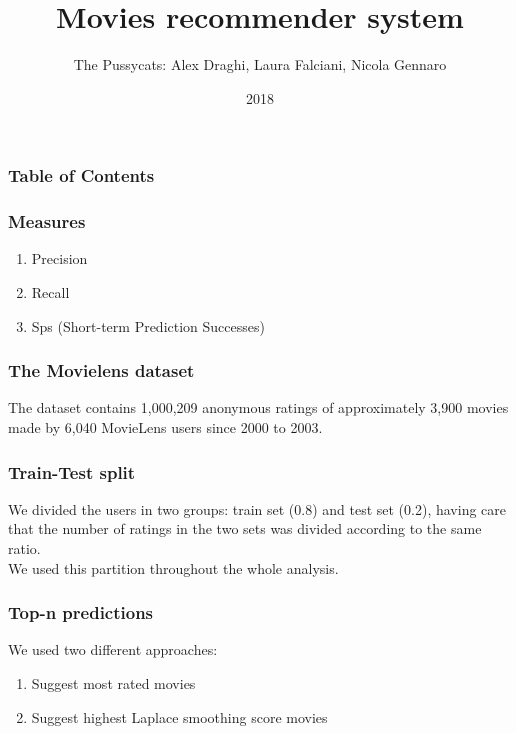 \documentclass{beamer}
\title{Movies recommender system}
\author{The Pussycats: Alex Draghi, Laura Falciani, Nicola Gennaro}
\date{2018}
\begin{document}
\frame{\titlepage}

\begin{frame}
\frametitle{Table of Contents}

\tableofcontents
\end{frame}






%
%

\begin{frame}

\frametitle{Measures}

\begin{enumerate}
	\item Precision
	\item Recall
	\item Sps (Short-term Prediction Successes) 
\end{enumerate}


\end{frame}


  \begin{frame}
  \frametitle{The Movielens dataset}

  The dataset contains 1,000,209 anonymous ratings of approximately 3,900 movies made by 6,040 MovieLens users since 2000 to 2003.
    
  \end{frame}


%
%
%

\begin{frame}

\frametitle{Train-Test split}
We divided the users in two groups: train set (0.8) and test set (0.2), having care that the number of ratings in the two sets was divided according to the same ratio. \\We used this partition throughout the whole analysis.

\end{frame}


%
%
%

\begin{frame}

\frametitle{Top-n predictions}

We used two different approaches:


\begin{enumerate}
	\item Suggest most rated movies
	\item Suggest highest Laplace smoothing score movies	
 \end{enumerate}


\end{frame}
\end{document}
